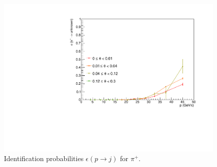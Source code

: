 \begin{figure}[!p]
  \includegraphics[scale=0.35]{./gfx/pip_u.pdf}
	\caption{Identification probabilities $\epsilon(p \rightarrow j)$ for $\pi^+$.}
	\label{pic:Effpip}
\end{figure}

